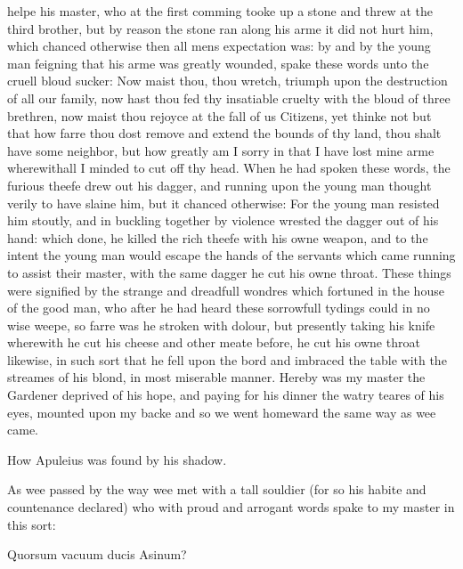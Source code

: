 helpe his master, who at the first comming tooke up a stone and threw at the
third brother, but by reason the stone ran along his arme it did not hurt him,
which chanced otherwise then all mens expectation was: by and by the young man
feigning that his arme was greatly wounded, spake these words unto the cruell
bloud sucker: Now maist thou, thou wretch, triumph upon the destruction of all
our family, now hast thou fed thy insatiable cruelty with the bloud of three
brethren, now maist thou rejoyce at the fall of us Citizens, yet thinke not but
that how farre thou dost remove and extend the bounds of thy land, thou shalt
have some neighbor, but how greatly am I sorry in that I have lost mine arme
wherewithall I minded to cut off thy head. When he had spoken these words, the
furious theefe drew out his dagger, and running upon the young man thought
verily to have slaine him, but it chanced otherwise: For the young man resisted
him stoutly, and in buckling together by violence wrested the dagger out of his
hand: which done, he killed the rich theefe with his owne weapon, and to the
intent the young man would escape the hands of the servants which came running
to assist their master, with the same dagger he cut his owne throat. These
things were signified by the strange and dreadfull wondres which fortuned in
the house of the good man, who after he had heard these sorrowfull tydings
could in no wise weepe, so farre was he stroken with dolour, but presently
taking his knife wherewith he cut his cheese and other meate before, he cut his
owne throat likewise, in such sort that he fell upon the bord and imbraced the
table with the streames of his blond, in most miserable manner. Hereby was my
master the Gardener deprived of his hope, and paying for his dinner the watry
teares of his eyes, mounted upon my backe and so we went homeward the same way
as wee came.


How Apuleius was found by his shadow.

As wee passed by the way wee met with a tall souldier (for so his habite and
countenance declared) who with proud and arrogant words spake to my master in
this sort:

Quorsum vacuum ducis Asinum?

